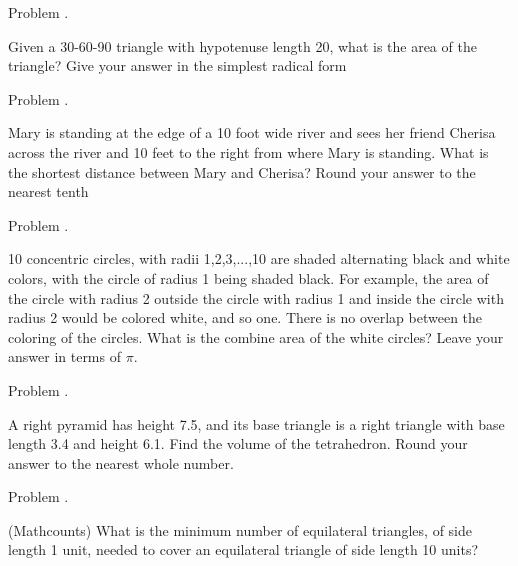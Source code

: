 \documentclass[9pt]{beamer}
\newcounter{problem}[section]
\begin{document}
\begin{frame}[t, fragile]{Problem \thesection.\theproblem}
    \begin{block}{}
    Given a 30-60-90 triangle with hypotenuse length 20, what is the area of the triangle? Give your answer in the simplest radical form
	
    \end{block}
\end{frame}
\begin{frame}[t, fragile]{Problem \thesection.\theproblem}
    \begin{block}{}
    Mary is standing at the edge of a 10 foot wide river and sees her friend Cherisa across the river and 10 feet to the right from where Mary is standing. What is the shortest distance between Mary and Cherisa? Round your answer to the nearest tenth
    
    \end{block}
\end{frame}
\begin{frame}[t, fragile]{Problem \thesection.\theproblem}
    \begin{block}{}
    10 concentric circles, with radii 1,2,3,...,10 are shaded alternating black and white colors, with the circle of radius 1 being shaded black. For example, the area of the circle with radius 2 outside the circle with radius 1 and inside the circle with radius 2 would be colored white, and so one. There is no overlap between the coloring of the circles. What is the combine area of the white circles? Leave your answer in terms of $ \pi $.
    
    \end{block}
\end{frame}
\begin{frame}[t, fragile]{Problem \thesection.\theproblem}
    \begin{block}{}
    A right pyramid has height 7.5, and its base triangle is a right triangle with base length 3.4 and height 6.1. Find the volume of the tetrahedron. Round your answer to the nearest whole number.
    
    \end{block}
\end{frame}
\begin{frame}[t, fragile]{Problem \thesection.\theproblem}
    \begin{block}{}
    (Mathcounts) What is the minimum number of equilateral triangles, of side length 1 unit, needed to cover an equilateral triangle of side length 10 units?
    
    \end{block}
\end{frame}
\end{document}
